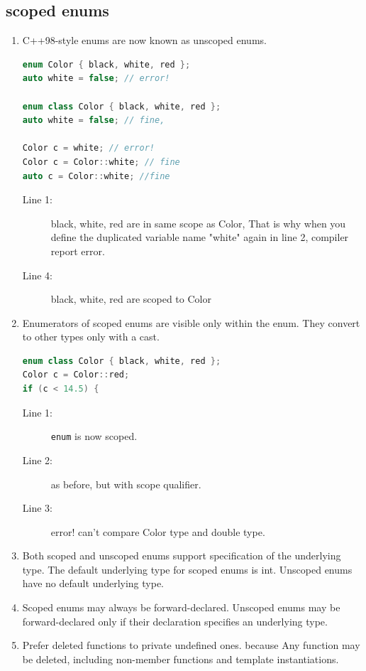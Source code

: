 \documentclass[a4paper,11pt,twoside]{book}
\begin{document}
\subsection{scoped enums}
\begin{enumerate}
\item C++98-style enums are now known as unscoped enums.
\begin{lstlisting}[frame=single, language=c++]
enum Color { black, white, red };
auto white = false; // error! 

enum class Color { black, white, red };
auto white = false; // fine, 

Color c = white; // error!
Color c = Color::white; // fine
auto c = Color::white; //fine
\end{lstlisting}
\begin{description}
	\item[Line 1:] black, white, red are in same scope as Color, That is why when you define the duplicated variable name "white" again in line 2, compiler report error.
	
	\item[Line 4:]black, white, red are scoped to Color
\end{description}

\item Enumerators of scoped enums are visible only within the enum. They convert
to other types only with a cast.
\begin{lstlisting}[frame=single, language=c++]
enum class Color { black, white, red }; 
Color c = Color::red; 
if (c < 14.5) { 
\end{lstlisting}
\begin{description}
	\item[Line 1:] \texttt{enum} is now scoped.
	\item[Line 2:] as before, but with scope qualifier.
	\item[Line 3:] error! can't compare Color type and double type.
\end{description}
\item Both scoped and unscoped enums support specification of the underlying type.
The default underlying type for scoped enums is int. Unscoped enums have no
default underlying type.

\item Scoped enums may always be forward-declared. Unscoped enums may be
forward-declared only if their declaration specifies an underlying type.

\item Prefer deleted functions to private undefined ones. because Any function may be deleted, including non-member functions and template instantiations.
\end{enumerate}
\end{document}
